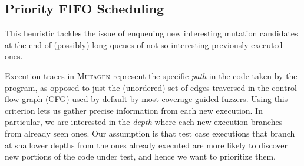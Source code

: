 \documentclass[sigconf, anonymous, review]{acmart}
\newcommand{\fuzzchick}{\textit{FuzzChick}\xspace}
\newcommand{\mutagen}{\textsc{Mutagen}\xspace}
\begin{document}
\subsection{Priority FIFO Scheduling}

This heuristic tackles the issue of enqueuing new interesting mutation
candidates at the end of (possibly) long queues of not-so-interesting previously
executed ones.

Execution traces in \mutagen represent the specific \emph{path} in the code
taken by the program, as opposed to just the (unordered) set of edges traversed
in the control-flow graph (CFG) used by default by most coverage-guided fuzzers.
%
Using this criterion lets us gather precise information from each new execution.
%
In particular, we are interested in the \emph{depth} where each new execution
branches from already seen ones.
%
Our assumption is that test case executions that branch at shallower depths from
the ones already executed are more likely to discover new portions of the code
under test, and hence we want to prioritize them.
\end{document}
